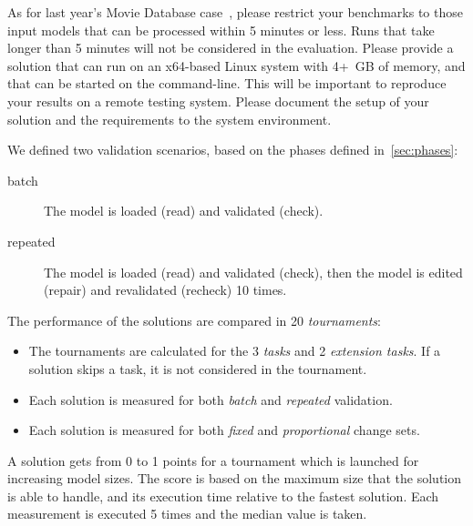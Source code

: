 \documentclass[submission,copyright,creativecommons]{eptcs}
\begin{document}
As for last year's Movie Database case~\cite{horn2014ttc}, please restrict your benchmarks to those input models that can be processed within 5 minutes or less. Runs that take longer than 5 minutes will not be considered in the evaluation. Please provide a solution that can run on an x64-based Linux system with 4+~GB of memory, and that can be started on the command-line. This will be important to reproduce your results on a remote testing system. Please document the setup of your solution and the requirements to the system environment.

We defined two validation scenarios, based on the phases defined in~\autoref{sec:phases}:

\begin{description}
\item[batch] The model is loaded (\textsf{read}) and validated (\textsf{check}).
\item[repeated] The model is loaded (\textsf{read}) and validated (\textsf{check}), then the model is edited (\textsf{repair}) and revalidated (\textsf{recheck}) 10 times.
\end{description}

The performance of the solutions are compared in 20 \emph{tournaments}:

\begin{itemize}
  \item The tournaments are calculated for the 3 \emph{tasks} and 2 \emph{extension tasks}. If a solution skips a task, it is not considered in the tournament.
  \item Each solution is measured for both \emph{batch} and \emph{repeated} validation.
  \item Each solution is measured for both \emph{fixed} and \emph{proportional} change sets.
\end{itemize}

A solution gets from 0 to 1 points for a tournament which is launched for increasing model sizes. The score is based on the maximum size that the solution is able to handle, and its execution time relative to the fastest solution. Each measurement is executed 5 times and the median value is taken.
\end{document}
